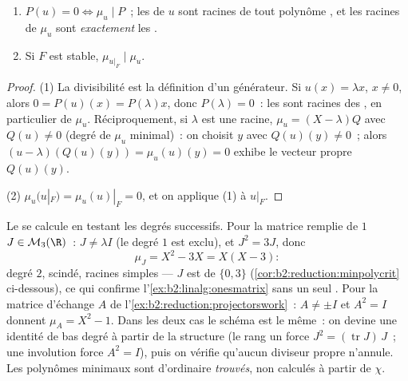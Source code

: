 \begin{proposition}\label{prop:b2:reduction:minpoly}
\begin{enumerate}
  \item $P(u) = 0 \iff \mu_u \mid P$~; les  de $u$ sont
        racines de tout polynôme , et les racines de $\mu_u$
        sont \emph{exactement} les .
  \item Si $F$ est stable, $\mu_{u|_F} \mid \mu_u$.
\end{enumerate}
\end{proposition}

\begin{proof}
(1) La divisibilité est la définition d'un générateur. Si $u(x) =
\lambda x$, $x \neq 0$, alors $0 = P(u)(x) = P(\lambda)x$, donc
$P(\lambda) = 0$~: les  sont racines des ,
en particulier de $\mu_u$. Réciproquement, si $\lambda$ est une
racine, $\mu_u = (X - \lambda)Q$ avec $Q(u) \neq 0$ (degré de $\mu_u$
minimal)~: on choisit $y$ avec $Q(u)(y) \neq 0$~; alors $(u -
\lambda)(Q(u)(y)) = \mu_u(u)(y) = 0$ exhibe le vecteur propre
$Q(u)(y)$.

(2) $\mu_u(u|_F) = \mu_u(u)|_F = 0$, et on applique (1) à $u|_F$.
\end{proof}

\begin{example}\label{ex:b2:reduction:minpolyhand}
Le  se calcule en testant les degrés successifs. Pour
la matrice remplie de $1$ $J \in \mathcal{M}_3(\R)$~: $J \neq \lambda
I$ (le degré $1$ est exclu), et $J^2 = 3J$, donc
\[
\mu_J = X^2 - 3X = X(X - 3) :
\]
degré $2$, scindé, racines simples --- $J$ est  de
 $\{0, 3\}$ (\cref{cor:b2:reduction:minpolycrit} ci-dessous),
ce qui confirme l'\cref{ex:b2:linalg:onesmatrix} sans un seul
. Pour la matrice d'échange $A$ de
l'\cref{ex:b2:reduction:projectorswork}~: $A \neq \pm I$ et $A^2 = I$
donnent $\mu_A = X^2 - 1$. Dans les deux cas le schéma est le même~:
on devine une identité de bas degré à partir de la structure (le rang
un force $J^2 = (\operatorname{tr}J)\,J$~; une involution force $A^2 =
I$), puis on vérifie qu'aucun diviseur propre n'annule. Les polynômes
minimaux sont d'ordinaire \emph{trouvés}, non calculés à partir de
$\chi$.
\end{example}

